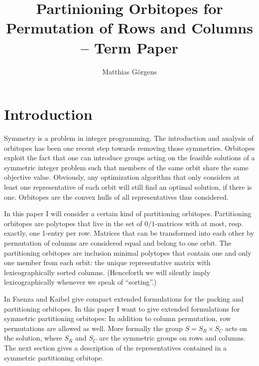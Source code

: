 \documentclass{amsart}
\author{Matthias Görgens}
\theoremstyle{definition}
\begin{document}
\title{Partinioning Orbitopes for Permutation of Rows and Columns -- Term Paper}
\maketitle


\section{Introduction}
Symmetry is a problem in integer programming.  The introduction and
analysis of orbitopes has been one recent step towards removing those
symmetries.  Orbitopes exploit the fact that one can introduce groups
acting on the feasible solutions of a symmetric integer problem such
that members of the same orbit share the same objective value.
Obviously, any optimization algorithm that only considers at least one
representative of each orbit will still find an optimal solution, if
there is one.  Orbitopes are the convex hulls of all representatives
thus considered.

In this paper I will consider a certain kind of partitioning
orbitopes.  Partitioning orbitopes are polytopes that live in the set
of $0/1$-matrices with at most, resp. exactly, one 1-entry per row.
Matrices that can be transformed into each other by permutation of
columns are considered equal and belong to one orbit.  The
partitioning orbitopes are inclusion minimal polytopes that contain
one and only one member from each orbit: the unique representative
matrix with lexicographically sorted columns.  (Henceforth we will
silently imply lexicographically whenever we speak of ``sorting''.)

In \cite{faenza-2008} Faenza and Kaibel give compact extended
formulations for the packing and partitioning orbitopes.  In this
paper I want to give extended formulations for symmetric partitioning
orbitopes: In addition to column permutation, row permutations are
allowed as well.  More formally the group \(S = S_R \times S_C\) acts
on the solution, where \(S_R\) and \(S_C\) are the symmetric groups on
rows and columns.  The next section gives a description of the
representatives contained in a symmetric partitioning orbitope.

\end{document}
